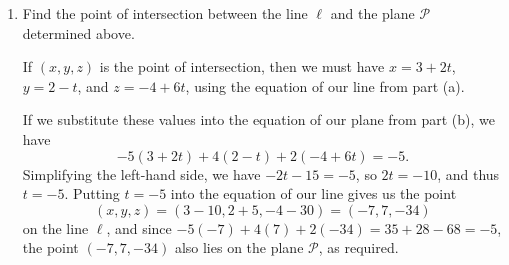 \documentclass[12pt]{article}
\newcommand{\points}[1]{\marginpar{\hspace{24pt}[#1]}}
\begin{document}
\begin{enumerate}
\begin{enumerate}
\bigskip


\item Find the point of intersection between the line $\ell$ and the plane $\mathcal{P}$ determined above. \points{4}

\bigskip

If $(x,y,z)$ is the point of intersection, then we must have $x=3+2t$, $y=2-t$, and $z=-4+6t$, using the equation of our line from part (a).

If we substitute these values into the equation of our plane from part (b), we have
\[
 -5(3+2t)+4(2-t)+2(-4+6t) = -5.
\]
Simplifying the left-hand side, we have $-2t-15=-5$, so $2t = -10$, and thus $t=-5$. Putting $t=-5$ into the equation of our line gives us the point
\[
 (x,y,z) = (3-10, 2+5, -4-30) = (-7, 7, -34)
\]
on the line $\ell$, and since $-5(-7)+4(7)+2(-34) = 35+28-68 = -5$, the point $(-7, 7, -34)$ also lies on the plane $\mathcal{P}$, as required.

\end{enumerate}


\end{enumerate}
\end{document}
